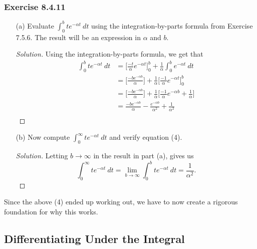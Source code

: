 \subsubsection{Exercise 8.4.11} 
\begin{enumerate}
    \item[(a)] Evaluate \( \int_{ 0 }^{ b  } t e^{- \alpha t } \  dt \) using the integration-by-parts formula from Exercise 7.5.6. The result will be an expression in \( \alpha  \) and \( b  \).
        \begin{proof}[Solution]
        Using the integration-by-parts formula, we get that 
        \begin{align*}
            \int_{ 0 }^{ b } t e^{- \alpha t } \  dt &= \Big[  \frac{ - t  }{ \alpha  }  e^{- \alpha t } \Big]_{0}^{b} + \frac{ 1 }{ \alpha  } \int_{ 0 }^{ b } e^{- \alpha t } \  dt \\
                                                     &= \Big[ \frac{ -b e^{-\alpha b } }{ \alpha  }  \Big] +  \frac{ 1 }{ \alpha  } \Big[ \frac{ -1  }{ \alpha  } e^{- \alpha t }  \Big]_{0}^{b} \\
                                                     &= \Big[ \frac{ -b e^{-\alpha b } }{ \alpha  }  \Big] +  \frac{ 1 }{ \alpha  } \Big[ \frac{ -1  }{ \alpha  } e^{- \alpha b  } + \frac{ 1 }{ \alpha  }   \Big] \\
                                                     &= \frac{ -b e^{-\alpha b } }{ \alpha  } - \frac{ e^{- \alpha b }  }{ \alpha^{2}  }  + \frac{ 1 }{ \alpha^{2} }    \\
        \end{align*}
        \end{proof}
    \item[(b)] Now compute \( \int_{ 0 }^{ \infty  }  t e^{-\alpha t } \  dt  \) and verify equation (4).
        \begin{proof}[Solution]
        Letting \( b \to \infty  \) in the result in part (a), gives us 
        \[  \int_{ 0 }^{ \infty  }  t e^{- \alpha t } \  dt = \lim_{ b \to \infty  }  \int_{ 0 }^{ b } t e^{- \alpha t } \ dt = \frac{ 1 }{ \alpha^{2}  }. \]
        \end{proof}
\end{enumerate}

Since the above (4) ended up working out, we have to now create a rigorous foundation for why this works. 

\subsection{Differentiating Under the Integral}

